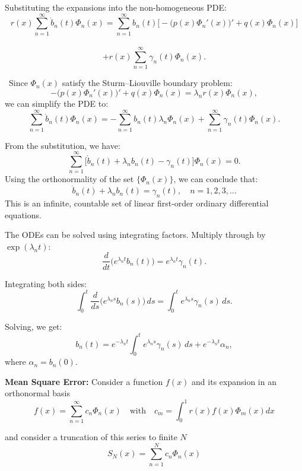 \documentclass[10pt,landscape]{article}
\begin{document}
\begin{multicols}{2}
Substituting the expansions into the non-homogeneous PDE:\\

\[
r(x) \sum_{n=1}^\infty \dot{b}_n(t) \Phi_n(x) = 
\sum_{n=1}^\infty b_n(t) \big[ -\big(p(x) \Phi_n'(x)\big)' + q(x) \Phi_n(x) \big] 
\]\\
\[+ r(x) \sum_{n=1}^\infty \gamma_n(t) \Phi_n(x).
\]

\
Since \(\Phi_n(x)\) satisfy the Sturm–Liouville boundary problem:\\
\[
-\big(p(x) \Phi_n'(x)\big)' + q(x) \Phi_n(x) = \lambda_n r(x) \Phi_n(x),
\]
we can simplify the PDE to:\\
\[
\sum_{n=1}^\infty \dot{b}_n(t) \Phi_n(x) = 
-\sum_{n=1}^\infty b_n(t) \lambda_n \Phi_n(x) + 
\sum_{n=1}^\infty \gamma_n(t) \Phi_n(x).
\]

From the substitution, we have:\\
\[
\sum_{n=1}^\infty \big[\dot{b}_n(t) + \lambda_n b_n(t) - \gamma_n(t)\big] \Phi_n(x) = 0.
\]
Using the orthonormality of the set \(\{\Phi_n(x)\}\), we can conclude that:\\
\[
\dot{b}_n(t) + \lambda_n b_n(t) = \gamma_n(t), \quad n = 1, 2, 3, \dots
\]
This is an infinite, countable set of linear first-order ordinary differential equations.

The ODEs can be solved using integrating factors. Multiply through by\\ \(\exp(\lambda_n t)\):
\[
\frac{d}{dt} \big(e^{\lambda_n t} b_n(t)\big) = e^{\lambda_n t} \gamma_n(t).
\]

Integrating both sides:\\
\[
\int_0^t \frac{d}{ds} \big(e^{\lambda_n s} b_n(s)\big) \, ds = \int_0^t e^{\lambda_n s} \gamma_n(s) \, ds.
\]

Solving, we get:\\
\[
b_n(t) = e^{-\lambda_n t} \int_0^t e^{\lambda_n s} \gamma_n(s) \, ds + e^{-\lambda_n t} \alpha_n,
\]
where \(\alpha_n = b_n(0)\).


\textbf{Mean Square Error:} Consider a function $f(x)$ and its expansion in an orthonormal basis \\

$$f(x) = \sum_{n=1}^\infty c_n\Phi_n(x)\quad \text{with} \quad c_m = \int_0^1 r(x)f(x)\Phi_m(x) dx$$

and consider a truncation of this series to finite $N$\\ 

$$S_N(x)= \sum_{n=1}^N c_n\Phi_n(x)$$


\end{multicols}
\end{document}
